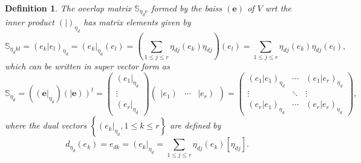 \documentclass[aps,preprint]{revtex4}
\newtheorem{definition}[theorem]{Definition}
\begin{document}
\begin{definition}
The overlap matrix $\mathbb{S}_{\eta _{d}e}$ formed by the baiss $\left( 
\boldsymbol{e}\right) $ of $V$ wrt the inner product $\left( \left.
{}\right\vert \right) _{\eta _{d}}$ has matrix elements given by%
\begin{equation}
\mathbb{S}_{\eta _{d}kl}=\left( \left. e_{k}\right\vert e_{l}\right) _{\eta
_{d}}=\left( \overset{}{e_{k}}\right\vert _{\eta _{d}}\left( \overset{}{e_{l}%
}\right) =\left( \sum_{1\leq j\leq r}\eta _{dj}\left( e_{k}\right) \eta
_{dj}\right) \left( \overset{}{e_{l}}\right) =\sum_{1\leq j\leq r}\eta
_{dj}\left( e_{k}\right) \eta _{dj}\left( e_{l}\right) ,
\end{equation}%
which can be written in super vector form as 
\begin{equation}
\mathbb{S}_{\eta _{d}}=\left( \left( \boldsymbol{e}\right\vert _{\eta
_{d}}\right) \left( \left\vert \boldsymbol{e}\right) \right) ^{t}=\left( 
\begin{array}{c}
\left( e_{1}\right\vert _{\eta _{d}} \\ 
\vdots \\ 
\left( e_{r}\right\vert _{\eta _{d}}%
\end{array}%
\right) \left( 
\begin{array}{ccc}
\left\vert e_{1}\right) & \cdots & \left\vert e_{r}\right)%
\end{array}%
\right) =\left( 
\begin{array}{ccc}
\left( \left. e_{1}\right\vert e_{1}\right) _{\eta _{d}} & \cdots & \left(
\left. e_{1}\right\vert e_{r}\right) _{\eta _{d}} \\ 
\vdots & \ddots & \vdots \\ 
\left( \left. e_{r}\right\vert e_{1}\right) _{\eta _{d}} & \cdots & \left(
\left. e_{r}\right\vert e_{r}\right) _{\eta _{d}}%
\end{array}%
\right) ,
\end{equation}%
where the dual vectors $\left\{ \left( \overset{}{e_{k}}\right\vert _{\eta
_{d}},1\leq k\leq r\right\} $ are defined by 
\begin{equation}
d_{\eta _{d}}\left( e_{k}\right) =e_{dk}=\left( \overset{}{e_{k}}\right\vert
_{\eta _{d}}=\sum_{1\leq j\leq r}\eta _{dj}\left( \overset{}{e_{k}}\right) %
\left[ \eta _{dj}\right] .
\end{equation}
\end{definition}
\end{document}
